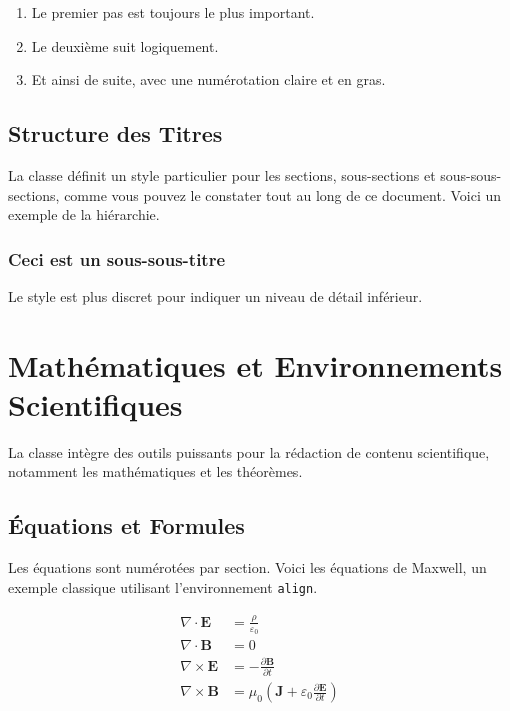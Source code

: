 \documentclass{butex}
\begin{document}
\begin{enumerate}
	\item Le premier pas est toujours le plus important.
	\item Le deuxième suit logiquement.
	\item Et ainsi de suite, avec une numérotation claire et en gras.
\end{enumerate}

\subsection{Structure des Titres}
La classe définit un style particulier pour les sections, sous-sections et sous-sous-sections, comme vous pouvez le constater tout au long de ce document. Voici un exemple de la hiérarchie.

\subsubsection{Ceci est un sous-sous-titre}
Le style est plus discret pour indiquer un niveau de détail inférieur.


\section{Mathématiques et Environnements Scientifiques}
La classe intègre des outils puissants pour la rédaction de contenu scientifique, notamment les mathématiques et les théorèmes.

\subsection{Équations et Formules}

Les équations sont numérotées par section. Voici les équations de Maxwell, un exemple classique utilisant l'environnement \texttt{align}.

\begin{align}
	\nabla \cdot \mathbf{E} &= \frac{\rho}{\varepsilon_0} \label{eq:maxwell1} \\
	\nabla \cdot \mathbf{B} &= 0 \label{eq:maxwell2} \\
	\nabla \times \mathbf{E} &= -\frac{\partial \mathbf{B}}{\partial t} \label{eq:maxwell3} \\
	\nabla \times \mathbf{B} &= \mu_0 \left( \mathbf{J} + \varepsilon_0 \frac{\partial \mathbf{E}}{\partial t} \right) \label{eq:maxwell4}
\end{align}
\end{document}
